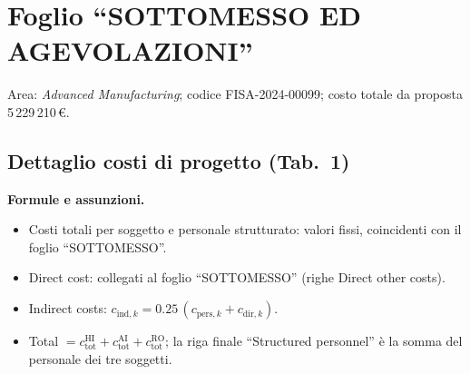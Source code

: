\documentclass{plan4ari_report}
\begin{document}
\section{Foglio ``SOTTOMESSO ED AGEVOLAZIONI''}
Area: \emph{Advanced Manufacturing}; codice FISA-2024-00099; costo totale da proposta 5\,229\,210\,\euro.

\subsection{Dettaglio costi di progetto (Tab.~1)}
\textbf{Formule e assunzioni.}
\begin{itemize}
  \item Costi totali per soggetto e personale strutturato: valori fissi, coincidenti con il foglio ``SOTTOMESSO''.
  \item Direct cost: collegati al foglio ``SOTTOMESSO'' (righe Direct other costs).
  \item Indirect costs: $c_{\mathrm{ind},k} = 0.25\,(c_{\mathrm{pers},k} + c_{\mathrm{dir},k})$.
  \item Total $= c^{\mathrm{HI}}_{\mathrm{tot}} + c^{\mathrm{AI}}_{\mathrm{tot}} + c^{\mathrm{RO}}_{\mathrm{tot}}$; la riga finale ``Structured personnel'' \`e la somma del personale dei tre soggetti.
\end{itemize}
\end{document}
